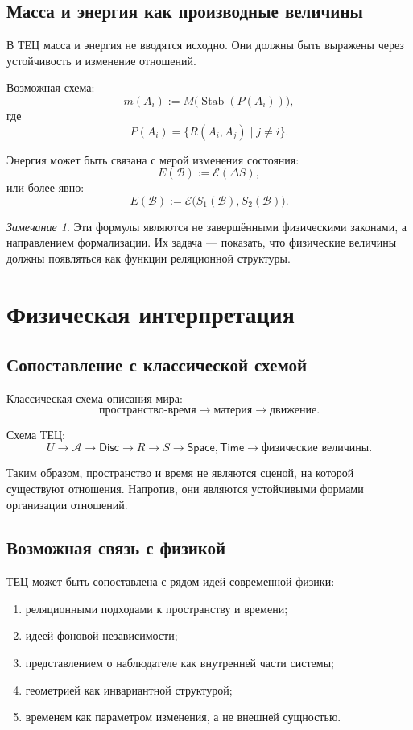 \documentclass[12pt,a4paper,oneside]{book}
\theoremstyle{definition}
\theoremstyle{plain}
\theoremstyle{remark}
\newtheorem{remark}{Замечание}[chapter]
\newcommand{\Whole}{U}
\newcommand{\Parts}{\mathcal A}
\newcommand{\SubParts}{\mathcal B}
\newcommand{\Rel}{R}
\newcommand{\State}{S}
\newcommand{\Space}{\mathsf{Space}}
\newcommand{\Time}{\mathsf{Time}}
\newcommand{\Disc}{\mathsf{Disc}}
\begin{document}
\section{Масса и энергия как производные величины}

В ТЕЦ масса и энергия не вводятся исходно. Они должны быть выражены через устойчивость и изменение отношений.

Возможная схема:
\[
m(A_i):=M\bigl(\operatorname{Stab}(P(A_i))\bigr),
\]
где
\[
P(A_i)=\{\Rel(A_i,A_j)\mid j\neq i\}.
\]

Энергия может быть связана с мерой изменения состояния:
\[
E(\SubParts):=\mathcal E(\Delta\State),
\]
или более явно:
\[
E(\SubParts):=\mathcal E\bigl(\State_1(\SubParts),\State_2(\SubParts)\bigr).
\]

\begin{remark}
Эти формулы являются не завершёнными физическими законами, а направлением формализации. Их задача --- показать, что физические величины должны появляться как функции реляционной структуры.
\end{remark}

\chapter{Физическая интерпретация}

\section{Сопоставление с классической схемой}

Классическая схема описания мира:
\[
\text{пространство-время} \rightarrow \text{материя} \rightarrow \text{движение}.
\]

Схема ТЕЦ:
\[
\Whole \rightarrow \Parts \rightarrow \Disc \rightarrow \Rel \rightarrow \State \rightarrow \Space,\Time \rightarrow \text{физические величины}.
\]

Таким образом, пространство и время не являются сценой, на которой существуют отношения. Напротив, они являются устойчивыми формами организации отношений.

\section{Возможная связь с физикой}

ТЕЦ может быть сопоставлена с рядом идей современной физики:

\begin{enumerate}
    \item реляционными подходами к пространству и времени;
    \item идеей фоновой независимости;
    \item представлением о наблюдателе как внутренней части системы;
    \item геометрией как инвариантной структурой;
    \item временем как параметром изменения, а не внешней сущностью.
\end{enumerate}
\end{document}
